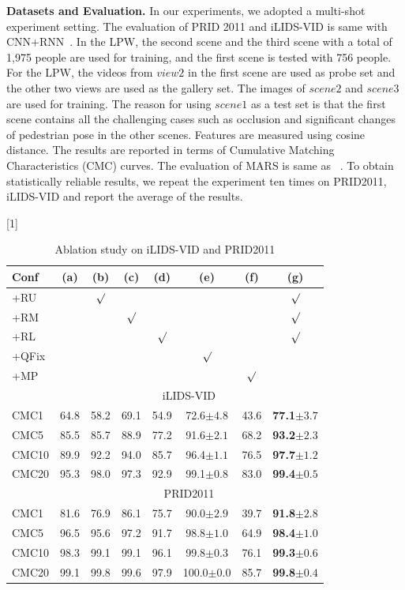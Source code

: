 \documentclass[letterpaper]{article} %
\begin{document}
{\bf Datasets and Evaluation.} In our experiments, we adopted a multi-shot experiment setting. The evaluation of PRID 2011 and iLIDS-VID is same with CNN+RNN~\cite{mclaughlin2016recurrent}. In the LPW, the second scene and the third scene with a total of 1,975 people are used for training, and the first scene is tested with 756 people. For the LPW, the videos from $view2$ in the first scene are used as probe set and the other two views are used as the gallery set. The images of $scene2$ and $scene3$ are used for training. The reason for using $scene1$ as a test set is that the first scene contains all the challenging cases such as occlusion and significant changes of pedestrian pose in the other scenes. Features are measured using cosine distance. The results are reported in terms of Cumulative Matching Characteristics (CMC) curves. The evaluation of MARS is same as ~\cite{zheng2016mars}. To obtain statistically reliable results, we repeat the experiment ten times on PRID2011, iLIDS-VID and report the average of the results.



\begin{table}[t]
\centering

\caption{Ablation study on iLIDS-VID and PRID2011}
\scalebox{0.8}[1]{

\begin{tabular}{l|c c c c c c c}
\hline
 Conf &(a)&(b)&(c)&(d)&(e)&(f)&(g) \\
  \hline
+RU &  & $\surd$ &  & & & &$\surd$\\
+RM &  & & $\surd$ & & & &$\surd$\\
+RL&  & &  & $\surd$& & &$\surd$\\
+QFix&  & &  & & $\surd$& & \\
+MP&  & &  & & &$\surd$& \\
\hline
 & \multicolumn{7}{c}{iLIDS-VID} \\
\hline
CMC1 & 64.8 & 58.2& 69.1 & 54.9& 72.6$\pm4.8$& 43.6& {\bf77.1$\pm3.7$}\\
CMC5 & 85.5 & 85.7& 88.9 & 77.2& 91.6$\pm2.1$& 68.2&{\bf93.2$\pm2.3$}\\
CMC10& 89.9 & 92.2& 94.0 & 85.7& 96.4$\pm1.1$& 76.5& {\bf97.7$\pm1.2$}\\
CMC20& 95.3 & 98.0& 97.3 & 92.9& 99.1$\pm0.8$& 83.0& {\bf99.4$\pm0.5$}\\
\hline
  & \multicolumn{7}{c}{PRID2011} \\
\hline
CMC1 & 81.6 & 76.9& 86.1 & 75.7& 90.0$\pm2.9$& 39.7& {\bf91.8$\pm2.8$}\\
CMC5 & 96.5 & 95.6& 97.2 & 91.7& 98.8$\pm1.0$& 64.9&{\bf98.4$\pm1.0$}\\
CMC10& 98.3 & 99.1& 99.1 & 96.1& 99.8$\pm0.3$& 76.1& {\bf99.3$\pm0.6$}\\
CMC20& 99.1 & 99.8& 99.6 & 97.9& 100.0$\pm0.0$& 85.7& {\bf99.8$\pm0.4$}\\
\hline
\end{tabular}}

\label{table:ablation}
\end{table}
\end{document}
